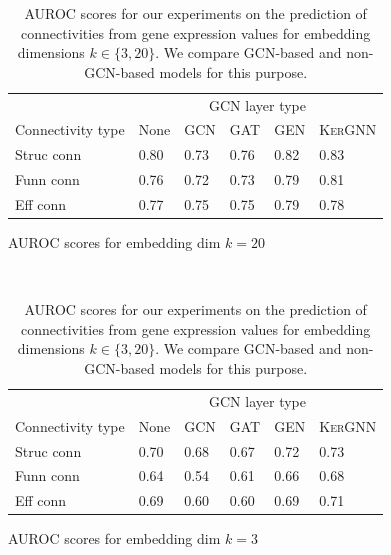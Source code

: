 \documentclass[]{article}
\begin{document}
\begin{table}
	\centering
	\renewcommand{\arraystretch}{1.2}
	\begin{subfigure}{1.\textwidth}
		\centering
		\begin{tabular}{|l|l|l|l|l|l|}
			\hline
			&\multicolumn{5}{c|}{GCN layer type}\\
			Connectivity type&None&\textsc{GCN}&\textsc{GAT}&\textsc{GEN}&\textsc{KerGNN}\\
			\hline
			Struc conn&0.80&0.73&0.76&0.82&0.83\\
			Funn conn&0.76&0.72&0.73&0.79&0.81\\
			Eff conn&0.77&0.75&0.75&0.79&0.78\\		
			\hline
		\end{tabular}
	
		\caption{AUROC scores for embedding dim $k=20$}
		\label{tab:results_connpred_20}
	\end{subfigure}\\

	\begin{subfigure}{1.0\textwidth}
		\vspace{0.5cm}
		\centering
		\begin{tabular}{|l|l|l|l|l|l|}
			\hline
			&\multicolumn{5}{c|}{GCN layer type}\\
			Connectivity type&None&\textsc{GCN}&\textsc{GAT}&\textsc{GEN}&\textsc{KerGNN}\\
			\hline
			Struc conn&0.70&0.68&0.67&0.72&0.73\\
			Funn conn&0.64&0.54&0.61&0.66&0.68\\
			Eff conn&0.69&0.60&0.60&0.69&0.71\\		
			\hline
		\end{tabular}
		
		\caption{AUROC scores for embedding dim $k=3$}
		\label{tab:results_connpred_3}
	\end{subfigure}	
	\caption[AUROC scores for our experiments on the prediction of connectivities from gene expression values for embedding dimensions $k\in \{3,20\}$]{AUROC scores for our experiments on the prediction of connectivities from gene expression values for embedding dimensions $k\in \{3,20\}$. We compare GCN-based and non-GCN-based models for this purpose.}
	\label{tab:conn_pred_GCN}
\end{table}
\end{document}
